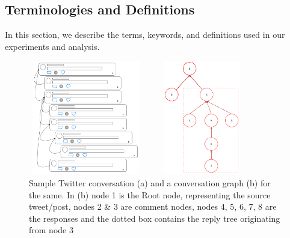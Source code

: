 \documentclass[acmtog]{acmart}
\begin{document}
\subsection{Terminologies and Definitions}
In this section, we describe the terms, keywords, and definitions used in our experiments and analysis.
\begin{figure}[h]
  \begin{minipage}{.25\textwidth}
    \centering
    \includegraphics[width=5cm,height=5cm,keepaspectratio]{sample_convv.png}
  \end{minipage}%
  \begin{minipage}{.25\textwidth}
    \centering
    \includegraphics[width=5cm,height=5cm,keepaspectratio]{sample_conv_graphh.png}
  \end{minipage}
  
  \caption{Sample Twitter conversation (a) and a conversation graph (b) for the same. In (b) node 1 is the Root node, representing the source tweet/post, nodes 2 \& 3 are comment nodes, nodes 4, 5, 6, 7, 8 are the responses and the dotted box contains the reply tree originating from node 3}
  \label{SampleConv}
  \end{figure}
\end{document}
